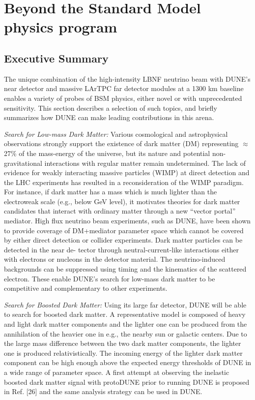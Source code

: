 \chapter{Beyond the Standard Model physics program }
\label{ch:bsm}

\section{Executive Summary}
The unique combination of the high-intensity LBNF neutrino beam with DUNE's near detector and massive LArTPC far detector modules at a 1300 km baseline enables a variety of probes of BSM physics, either novel or with unprecedented sensitivity. This section describes a selection of such topics, and briefly summarizes how DUNE can make leading contributions in this arena.


{\it Search for Low-mass Dark Matter:} Various cosmological and astrophysical observations strongly support the existence of dark matter (DM) representing $\approx$27\% of the mass-energy of the universe, but its nature and potential non-gravitational interactions with regular matter remain undetermined. The lack of evidence for weakly interacting massive particles (WIMP) at direct detection and the LHC experiments has resulted in a reconsideration of the WIMP paradigm. For instance, if dark matter has a mass which is much lighter than the electroweak scale (e.g., below GeV level), it motivates theories for dark matter candidates that interact with ordinary matter through a new ``vector portal'' mediator. High flux neutrino beam experiments, such as DUNE, have been shown to provide coverage of DM+mediator parameter space which cannot be covered by either direct detection or collider experiments. Dark matter particles can be detected in the near de- tector through neutral-current-like interactions either with electrons or nucleons in the detector material. The neutrino-induced backgrounds can be suppressed using timing and the kinematics of the scattered electron. These enable DUNE's search for low-mass dark matter to be competitive and complementary to other experiments.

{\it Search for Boosted Dark Matter:} Using its large far detector, DUNE will be able to search for boosted dark matter. A representative model is composed of heavy and light dark matter components and the lighter one can be produced from the annihilation of the heavier one in e.g., the nearby sun or galactic centers. Due to the large mass difference between the two dark matter components, the lighter one is produced relativistically. The incoming energy of the lighter dark matter component can be high enough above the expected energy thresholds of DUNE in a wide range of parameter space. A first attempt at observing the inelastic boosted dark matter signal with protoDUNE prior to running DUNE is proposed in Ref. [26] and the same analysis strategy can be used in DUNE.

